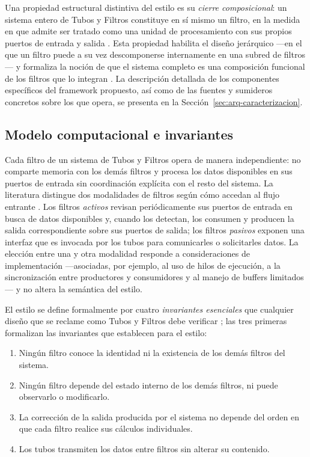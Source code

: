 \documentclass[12pt]{report}
\begin{document}
Una propiedad estructural distintiva del estilo es su \textit{cierre composicional}: un sistema entero de Tubos y Filtros constituye en sí mismo un filtro, en la medida en que admite ser tratado como una unidad de procesamiento con sus propios puertos de entrada y salida \citep[p.~24]{cristia:2025}. Esta propiedad habilita el diseño jerárquico ---en el que un filtro puede a su vez descomponerse internamente en una subred de filtros--- y formaliza la noción de que el sistema completo es una composición funcional de los filtros que lo integran \citep{garlanshaw:1994}. La descripción detallada de los componentes específicos del framework propuesto, así como de las fuentes y sumideros concretos sobre los que opera, se presenta en la Sección~\ref{sec:arq-caracterizacion}.

\subsection{Modelo computacional e invariantes}
\label{sec:arq-estilo-invariantes}

Cada filtro de un sistema de Tubos y Filtros opera de manera independiente: no comparte memoria con los demás filtros y procesa los datos disponibles en sus puertos de entrada sin coordinación explícita con el resto del sistema. La literatura distingue dos modalidades de filtros según cómo accedan al flujo entrante \citep{cristia:2025}. Los filtros \textit{activos} revisan periódicamente sus puertos de entrada en busca de datos disponibles y, cuando los detectan, los consumen y producen la salida correspondiente sobre sus puertos de salida; los filtros \textit{pasivos} exponen una interfaz que es invocada por los tubos para comunicarles o solicitarles datos. La elección entre una y otra modalidad responde a consideraciones de implementación ---asociadas, por ejemplo, al uso de hilos de ejecución, a la sincronización entre productores y consumidores y al manejo de buffers limitados--- y no altera la semántica del estilo.

El estilo se define formalmente por cuatro \textit{invariantes esenciales} que cualquier diseño que se reclame como Tubos y Filtros debe verificar \citep[p.~23]{cristia:2025}; las tres primeras formalizan las invariantes que \citet{garlanshaw:1994} establecen para el estilo:

\begin{enumerate}
  \item Ningún filtro conoce la identidad ni la existencia de los demás filtros del sistema.
  \item Ningún filtro depende del estado interno de los demás filtros, ni puede observarlo o modificarlo.
  \item La corrección de la salida producida por el sistema no depende del orden en que cada filtro realice sus cálculos individuales.
  \item Los tubos transmiten los datos entre filtros sin alterar su contenido.
\end{enumerate}
\end{document}
